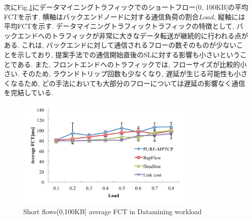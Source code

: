 次にFig.\ref{fig:datamining_FCT_ave}にデータマイニングトラフィックでのショートフロー(0, 100KB]の平均FCTを示す. 
横軸はバックエンドノードに対する通信負荷の割合$Load$, 縦軸には平均FCTを示す. 
データマイニングトラフィックトラフィックの特徴として, バックエンドへのトラフィックが非常に大きなデータ転送が継続的に行われる点がある. 
これは, バックエンドに対して通信されるフローの数そのものが少ないことを示しており, 提案手法での通信開始直後のSLに対する影響も小さいということである. 
また, フロントエンドへのトラフィックでは, フローサイズが比較的小さい. 
そのため, ラウンドトリップ回数も少なくなり, 遅延が生じる可能性も小さくなるため,
どの手法においても大部分のフローについては遅延の影響なく通信を完結している. 

\begin{figure}[t]
    \begin{center}
    \includegraphics[autoebb, width=250pt]{./img/mining_avr.pdf}
    \caption{Short flows(0,100KB] average FCT in Datamining workload}
    \label{fig:datamining_FCT_ave}
    \end{center}
\end{figure}

